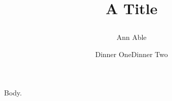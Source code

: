 \documentclass{article}
\begin{document}
\title{A Title \author{Ann Able \date{Dinner One}}}
\date{Dinner Two}
\maketitle
Body.
\end{document}
